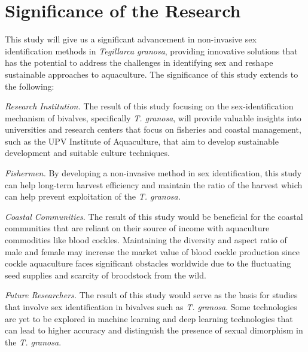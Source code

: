 \section{Significance of the Research}
\label{sec:significance}

This study will give us a significant advancement in non-invasive sex identification methods in \textit{Tegillarca granosa}, providing innovative solutions that has the potential to address the challenges in identifying sex and reshape sustainable approaches to aquaculture. The significance of this study extends to the following:

\textit{Research Institution.} The result of this study focusing on the sex-identification mechanism of bivalves, specifically \textit{T. granosa}, will provide valuable insights into universities and research centers that focus on fisheries and coastal management, such as the UPV Institute of Aquaculture, that aim to develop sustainable development and suitable culture techniques.

\textit{Fishermen.} By developing a non-invasive method in sex identification, this study can help long-term harvest efficiency and maintain the ratio of the harvest which can help prevent exploitation of the \textit{T. granosa.}

\textit{Coastal Communities.} The result of this study would be beneficial for the coastal communities that are reliant on their source of income with aquaculture commodities like blood cockles. Maintaining the diversity and aspect ratio of male and female may increase the market value of blood cockle production since cockle aquaculture faces significant obstacles worldwide due to the fluctuating seed supplies and scarcity of broodstock from the wild. 

\textit{Future Researchers.} The result of this study would serve as the basis for studies that involve sex identification in bivalves such as \textit{T. granosa}. Some technologies are yet to be explored in machine learning and deep learning technologies that can lead to higher accuracy and distinguish the presence of sexual dimorphism in the \textit{T. granosa}.


